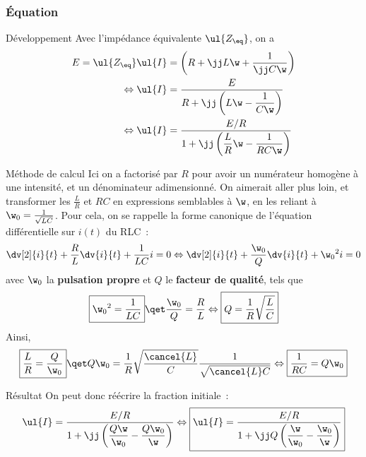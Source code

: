 \documentclass[../main/main.tex]{subfiles}
\begin{document}
\subsubsection{Équation}
\begin{rexem}{Développement}
    Avec l'impédance équivalente $\ul{Z_{\eq}}$, on a 
    \begin{align*}
        E = \ul{Z_{\eq}}\ul{I} &= \left( R + \jj L\w + \frac{1}{\jj C\w} \right)\\
        \Leftrightarrow
        \ul{I} &= \frac{E}{R + \jj \left( L\w - \dfrac{1}{C\w} \right)}\\
        \Leftrightarrow
        \ul{I} &= \frac{E/R}{1 + \jj \left( \dfrac{L}{R}\w  - \dfrac{1}{RC\w}\right)}
    \end{align*}
\end{rexem}
\begin{rdemo}{Méthode de calcul}
    Ici on a factorisé par $R$ pour avoir un numérateur homogène à une intensité, et
    un dénominateur adimensionné. On aimerait aller plus loin, et transformer les
    $\frac{L}{R}$ et $RC$ en expressions semblables à $\w$, en les reliant à $\w_0 =
    \frac{1}{\sqrt{LC}}$. Pour cela, on se rappelle la forme canonique de l'équation
    différentielle sur $i(t)$ du RLC~:
    \[
        \dv[2]{i}{t} + \frac{R}{L} \dv{i}{t} + \frac{1}{LC}i = 0
        \Leftrightarrow
        \dv[2]{i}{t} + \frac{\w_0}{Q} \dv{i}{t} + \w_0{}^2i = 0
    \]
    avec $\w_0$ la \textbf{pulsation propre} et $Q$ le \textbf{facteur de qualité},
    tels que
    \begin{gather*}
        \boxed{\w_0{}^2 = \frac{1}{LC}}
        \qet
        \frac{\w_0}{Q} = \frac{R}{L}
        \Leftrightarrow
        \boxed{Q = \frac{1}{R} \sqrt{\frac{L}{C}}}
    \end{gather*}
    Ainsi,
    \begin{gather*}
        \boxed{\frac{L}{R} = \frac{Q}{\w_0}}
        \qet
        Q\w_0 = \frac{1}{R} \sqrt{\frac{\cancel{L}}{C}} \frac{1}{\sqrt{\cancel{L}C}}
        \Leftrightarrow
        \boxed{ \frac{1}{RC} = Q\w_0}
    \end{gather*}
\end{rdemo}
\begin{rprop}{Résultat}
    On peut donc réécrire la fraction initiale~:
    \begin{gather*}
        \ul{I} = \frac{E/R}{1 + \jj \left( \dfrac{Q\w}{\w_0} - \dfrac{Q\w_0}{\w}
        \right)}
        \Leftrightarrow
        \boxed{
            \ul{I} = \frac{E/R}{1 + \jj Q \left(
                \dfrac{\w}{\w_0} - \dfrac{\w_0}{\w}
            \right)}}
    \end{gather*}
\end{rprop}
\end{document}
